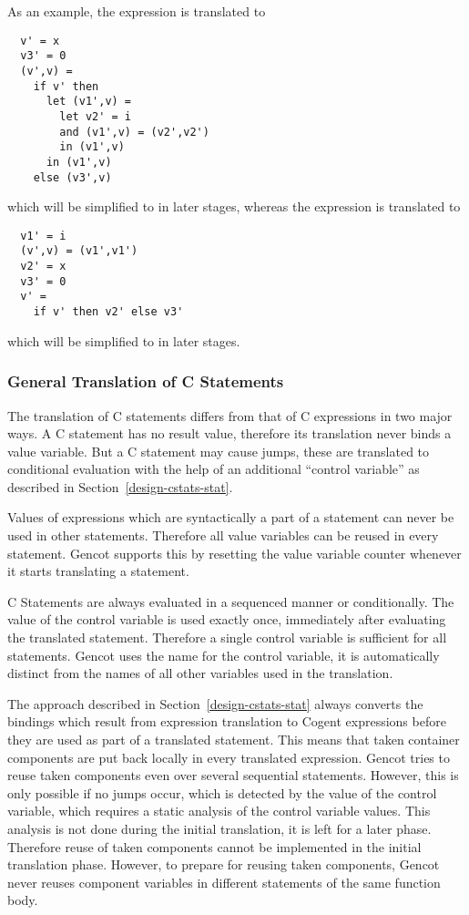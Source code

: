 As an example, the expression  is translated to
\begin{verbatim}
  v' = x
  v3' = 0
  (v',v) = 
    if v' then 
      let (v1',v) = 
        let v2' = i 
        and (v1',v) = (v2',v2') 
        in (v1',v) 
      in (v1',v)
    else (v3',v)
\end{verbatim}
which will be simplified to  in later stages,
whereas the expression  is translated to
\begin{verbatim}
  v1' = i
  (v',v) = (v1',v1')
  v2' = x
  v3' = 0
  v' = 
    if v' then v2' else v3'
\end{verbatim}
which will be simplified to  in later stages.

\subsubsection{General Translation of C Statements}

The translation of C statements differs from that of C expressions in two major ways. A C statement has no result 
value, therefore its translation never binds a value variable. But a C statement may cause jumps, these are translated
to conditional evaluation with the help of an additional ``control variable''  as described in 
Section~\ref{design-cstats-stat}.

Values of expressions which are syntactically a part of a statement can never be used in other statements. Therefore
all value variables can be reused in every statement. Gencot supports this by resetting the value variable counter 
whenever it starts translating a statement.

C Statements are always evaluated in a sequenced manner or conditionally. The value of the control variable is used exactly
once, immediately after evaluating the translated statement. Therefore a single control variable is sufficient for 
all statements. Gencot uses the name  for the control variable, it is automatically distinct from the names of
all other variables used in the translation.

The approach described in Section~\ref{design-cstats-stat} always converts the bindings which result from expression 
translation to Cogent expressions before they are used as part of a translated statement. This means that taken
container components are put back locally in every translated expression. Gencot tries to reuse taken components even 
over several sequential statements. However, this is only possible if no jumps occur, which is detected by the value
of the control variable, which requires a static analysis of the control variable values. This analysis is not done
during the initial translation, it is left for a later phase. Therefore reuse of taken components cannot be implemented
in the initial translation phase. However, to prepare for reusing taken components, Gencot never reuses component variables
in different statements of the same function body.

